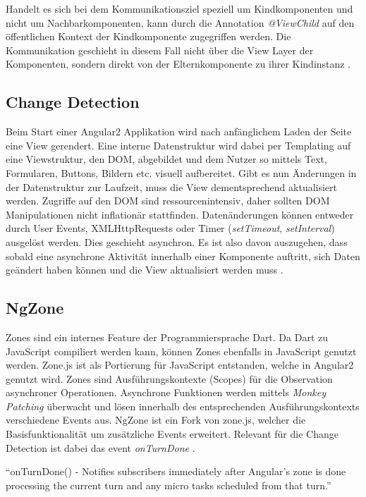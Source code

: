 Handelt es sich bei dem Kommunikationsziel speziell um Kindkomponenten und nicht um Nachbarkomponenten,
kann durch die Annotation \emph{@ViewChild} auf den öffentlichen Kontext der Kindkomponente zugegriffen werden.
Die Kommunikation geschieht in diesem Fall nicht über die View Layer der Komponenten,
sondern direkt von der Elternkomponente zu ihrer Kindinstanz \cite{ViewC61:online}.


\subsection{Change Detection}
\label{sec:change-detection}

Beim Start einer Angular2 Applikation wird nach anfänglichem Laden der Seite eine View gerendert.
Eine interne Datenstruktur wird dabei per Templating auf eine Viewstruktur, den DOM, abgebildet und dem Nutzer so mittels Text,
Formularen, Buttons, Bildern etc. visuell aufbereitet.
Gibt es nun Änderungen in der Datenstruktur zur Laufzeit, muss die View dementsprechend aktualisiert werden.
Zugriffe auf den DOM sind ressourcenintensiv, daher sollten DOM Manipulationen nicht inflationär stattfinden.
Datenänderungen können entweder durch User Events, XMLHttpRequests oder Timer (\emph{setTimeout}, \emph{setInterval}) ausgelöst werden.
Dies geschieht asynchron. Es ist also davon auszugehen, dass sobald eine asynchrone Aktivität innerhalb einer Komponente auftritt,
sich Daten geändert haben können und die View aktualisiert werden muss \cite{changedetection-explained}.

\subsection{NgZone}

Zones sind ein internes Feature der Programmiersprache Dart. Da Dart zu JavaScript compiliert werden kann,
können Zones ebenfalls in JavaScript genutzt werden. Zone.js ist als Portierung für JavaScript entstanden, welche in Angular2 genutzt wird.
Zones sind Ausführungskontexte (Scopes) für die Observation asynchroner Operationen.
Asynchrone Funktionen werden mittels \emph{Monkey Patching} überwacht und lösen innerhalb des entsprechenden Ausführungskontexts verschiedene Events aus.
NgZone ist ein Fork von zone.js, welcher die Basisfunktionalität um zusätzliche Events erweitert.
Relevant für die Change Detection ist dabei das event \emph{onTurnDone} \cite{changedetection-explained}.

\vspace{0.3cm}
``onTurnDone() - Notifies subscribers immediately after Angular’s zone is done processing the current turn and any micro tasks scheduled from that turn.''
\cite{ZONESINANGULAR2}
\vspace{0.3cm}

